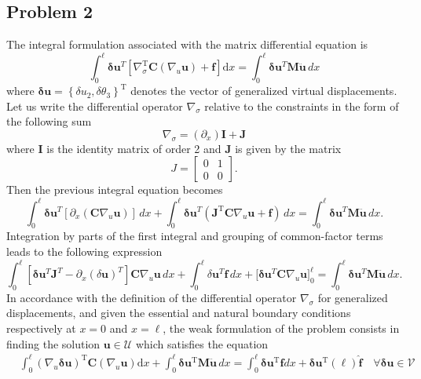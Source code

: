 \documentclass[12pt]{article}
\begin{document}
\subsection*{Problem 2}
The integral formulation associated with the matrix differential equation is
$$
    \int_0^{\ell} \boldsymbol\delta \mathbf{u}^{T}\left[\nabla_\sigma^{\mathrm{T}} \mathbf{C}\left(\nabla_u \mathbf{u}\right)+\mathbf{f}\right] \mathrm{d} x=\int_0^{\ell} \boldsymbol\delta \mathbf{u}^{T} \mathbf{M} \ddot{\mathbf{u}}\, d x
$$
where $\boldsymbol\delta \mathbf{u}=\left\{\delta u_2, \delta \theta_3\right\}^{\mathrm{T}}$ denotes the vector of generalized virtual displacements.
Let us write the differential operator $\nabla_\sigma$ relative to the constraints in the form of the following sum
$$
    \nabla_\sigma=(\partial_{ x}) \mathbf{I}+\mathbf{J}
$$
where $\mathbf I$ is the identity matrix of order 2 and $\mathbf{J}$ is given by the matrix
$$
    J=\left[\begin{array}{ll}
            0 & 1 \\
            0 & 0
        \end{array}\right].
$$
Then the previous integral equation becomes
$$
    \int_0^{\ell} \boldsymbol\delta \mathbf{u}^{T} [\partial_{ x}(\mathbf{C} \nabla_u \mathbf{u})]\, dx+\int_0^{\ell} \boldsymbol\delta \mathbf{u}^{T}(\mathbf{J}^{\mathrm{T}} \mathbf{C} \nabla_u \mathbf{u}+\mathbf{f})\, dx =\int_0^{\ell} \boldsymbol\delta \mathbf{u}^{T} \mathbf{M} \ddot{\mathbf{u}}\, dx.
$$
Integration by parts of the first integral and grouping of common-factor terms leads to the following expression
$$
    \int_0^{\ell} [\boldsymbol\delta \mathbf{u}^{T}\mathbf{J}^{T}-\partial_{x}(\delta \mathbf{u})^T]\mathbf{C}
    \nabla_u \mathbf{u}\, dx+\int_0^{\ell} \delta \mathbf{u}^{T} \mathbf{f}\, dx+\Big[\boldsymbol\delta \mathbf{u}^{T} \mathbf{C} \nabla_u \mathbf{u}\Big]_0 ^{\ell}=\int_0^{\ell} \boldsymbol\delta \mathbf{u}^{T} \mathbf{M} \ddot{\mathbf{u}}\, d x.
$$
In accordance with the definition of the differential operator $\nabla_{\sigma}$ for generalized displacements, and given the essential and natural boundary conditions respectively at $x=0$ and $x=\ell$, the weak formulation of the problem consists in finding the solution $\mathbf{u} \in \mathcal U$ which satisfies the equation
$$
    \begin{aligned}
         & \int_0^{\ell}\left(\nabla_u \boldsymbol\delta \mathbf{u}\right)^{\mathrm{T}} \mathbf{C}\left(\nabla_u \mathbf{u}\right) \mathrm{d} x+\int_0^{\ell} \boldsymbol\delta \mathbf{u}^{\mathrm{T}} \mathbf{M} \ddot{\mathbf{u}}\, d x =\int_0^{\ell} \boldsymbol\delta \mathbf{u}^{\mathrm{T}} \mathbf{f} d x+\boldsymbol\delta \mathbf{u}^{\mathrm{T}}(\ell)\mathbf{\hat f} \quad \forall \boldsymbol\delta \mathbf{u} \in \mathcal{V}
    \end{aligned}
$$
\end{document}
